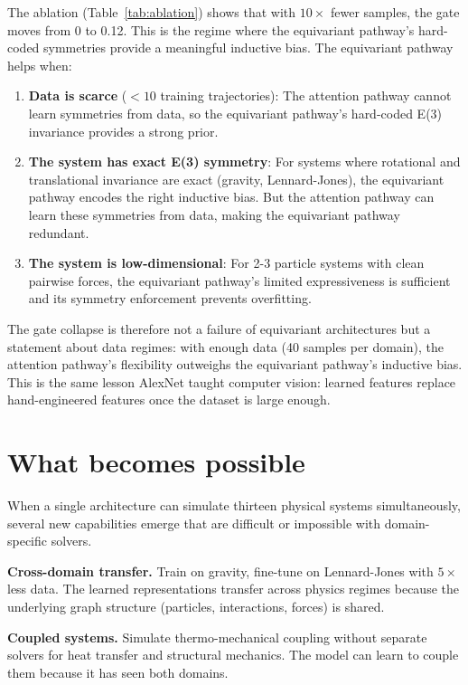 \documentclass[10pt,twocolumn]{article}
\begin{document}
The ablation (Table~\ref{tab:ablation}) shows that with $10\times$ fewer samples, the gate moves from 0 to 0.12. This is the regime where the equivariant pathway's hard-coded symmetries provide a meaningful inductive bias. The equivariant pathway helps when:

\begin{enumerate}[nosep]
    \item \textbf{Data is scarce} ($< 10$ training trajectories): The attention pathway cannot learn symmetries from data, so the equivariant pathway's hard-coded E(3) invariance provides a strong prior.
    \item \textbf{The system has exact E(3) symmetry}: For systems where rotational and translational invariance are exact (gravity, Lennard-Jones), the equivariant pathway encodes the right inductive bias. But the attention pathway can learn these symmetries from data, making the equivariant pathway redundant.
    \item \textbf{The system is low-dimensional}: For 2-3 particle systems with clean pairwise forces, the equivariant pathway's limited expressiveness is sufficient and its symmetry enforcement prevents overfitting.
\end{enumerate}

The gate collapse is therefore not a failure of equivariant architectures but a statement about data regimes: with enough data (40 samples per domain), the attention pathway's flexibility outweighs the equivariant pathway's inductive bias. This is the same lesson AlexNet taught computer vision: learned features replace hand-engineered features once the dataset is large enough.

\section{What becomes possible}

When a single architecture can simulate thirteen physical systems simultaneously, several new capabilities emerge that are difficult or impossible with domain-specific solvers.

\textbf{Cross-domain transfer.} Train on gravity, fine-tune on Lennard-Jones with $5\times$ less data. The learned representations transfer across physics regimes because the underlying graph structure (particles, interactions, forces) is shared.

\textbf{Coupled systems.} Simulate thermo-mechanical coupling without separate solvers for heat transfer and structural mechanics. The model can learn to couple them because it has seen both domains.
\end{document}
